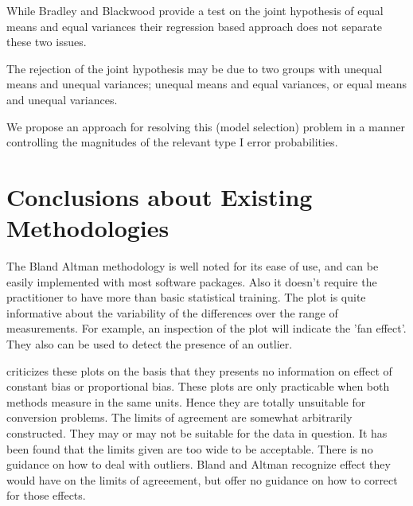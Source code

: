 \documentclass[12pt, a4paper]{report}
\theoremstyle{plain}
\theoremstyle{definition}
\theoremstyle{remark}
\begin{document}
While Bradley and Blackwood provide a test on the joint hypothesis of equal means and equal variances their regression 
based approach does not separate these two issues.

The rejection of the joint hypothesis may be 
due to two groups with unequal means and unequal variances; unequal means and equal variances, or equal means and unequal variances. 

We propose an approach for resolving this (model selection) problem in a manner controlling the magnitudes of the 
relevant type I error probabilities.





\section{Conclusions about Existing Methodologies}

The Bland Altman methodology is well noted for its ease of use,
and can be easily implemented with most software packages. Also it
doesn't require the practitioner to have more than basic
statistical training. The plot is quite informative about the
variability of the differences over the range of measurements. For
example, an inspection of the plot will indicate the 'fan effect'.
They also can be used to detect the presence of an outlier.

\citet{ludbrook97,ludbrook02} criticizes these plots on the
basis that they presents no information on effect of constant bias
or proportional bias. These plots are only practicable when both
methods measure in the same units. Hence they are totally
unsuitable for conversion problems. The limits of agreement are
somewhat arbitrarily constructed. They may or may not be suitable
for the data in question. It has been found that the limits given
are too wide to be acceptable. There is no guidance on how to deal
with outliers. Bland and Altman recognize effect they would have
on the limits of agreeement, but offer no guidance on how to
correct for those effects.
\end{document}
